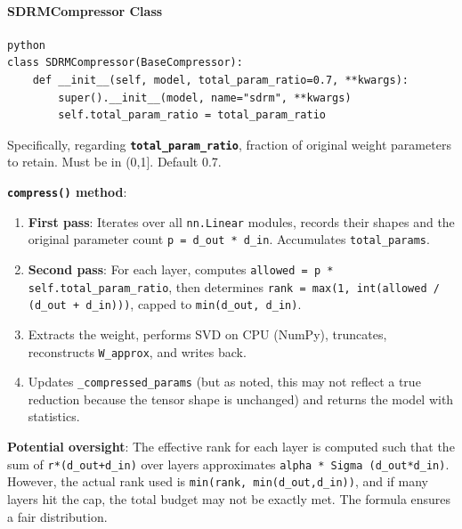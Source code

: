 \paragraph{SDRMCompressor Class}

\vspace{0.5em}
\begin{mdframed}[backgroundcolor=codebg, linecolor=codeframe, linewidth=1pt, roundcorner=4pt, innerleftmargin=2pt, innerrightmargin=5pt, innertopmargin=5pt, innerbottommargin=5pt]
\begin{lstlisting}
python
class SDRMCompressor(BaseCompressor):
    def __init__(self, model, total_param_ratio=0.7, **kwargs):
        super().__init__(model, name="sdrm", **kwargs)
        self.total_param_ratio = total_param_ratio
\end{lstlisting}
\end{mdframed}
\vspace{0.5em}

Specifically, regarding \textbf{\texttt{total\_param\_ratio}}, fraction of original weight parameters to retain. Must be in (0,1]. Default 0.7.


\textbf{\texttt{compress()} method}:

\begin{enumerate}
\item \textbf{First pass}: Iterates over all \texttt{nn.Linear} modules, records their shapes and the original parameter count \texttt{p = d\_out * d\_in}. Accumulates \texttt{total\_params}.
\item \textbf{Second pass}: For each layer, computes \texttt{allowed = p * self.total\_param\_ratio}, then determines \texttt{rank = max(1, int(allowed / (d\_out + d\_in)))}, capped to \texttt{min(d\_out, d\_in)}.
\item Extracts the weight, performs SVD on CPU (NumPy), truncates, reconstructs \texttt{W\_approx}, and writes back.
\item Updates \texttt{\_compressed\_params} (but as noted, this may not reflect a true reduction because the tensor shape is unchanged) and returns the model with statistics.

\end{enumerate}
\textbf{Potential oversight}: The effective rank for each layer is computed such that the sum of \texttt{r*(d\_out+d\_in)} over layers approximates \texttt{alpha * Sigma (d\_out*d\_in)}. However, the actual rank used is \texttt{min(rank, min(d\_out,d\_in))}, and if many layers hit the cap, the total budget may not be exactly met. The formula ensures a fair distribution.


